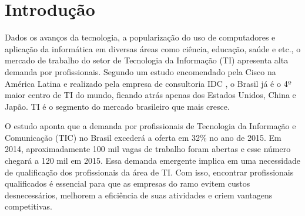 
\begin{center}

\end{center}
\chapter{Introdução}

\label{chap:introduction}

Dados os avanços da tecnologia, a popularização do uso de computadores e aplicação da informática em diversas áreas como ciência, educação, saúde e etc., o mercado de trabalho do setor de Tecnologia da Informação (TI) apresenta alta demanda por profissionais. Segundo um estudo encomendado pela Cisco na América Latina e realizado pela empresa de consultoria IDC \cite{cisco:13}, o Brasil já é o 4º maior centro de TI do mundo, ficando atrás apenas dos Estados Unidos, China e Japão. TI é o segmento do mercado brasileiro que mais cresce. 


O estudo aponta que a demanda por profissionais de Tecnologia da Informação e Comunicação (TIC) no Brasil excederá a oferta em 32\% no ano de 2015. Em 2014, aproximadamente 100 mil vagas de trabalho foram abertas e esse número chegará a 120 mil em 2015. Essa demanda emergente implica em uma necessidade de qualificação dos profissionais da área de TI. Com isso, encontrar profissionais qualificados é essencial para que as empresas do ramo evitem custos desnecessários, melhorem a eficiência de suas atividades e criem vantagens competitivas.

 

